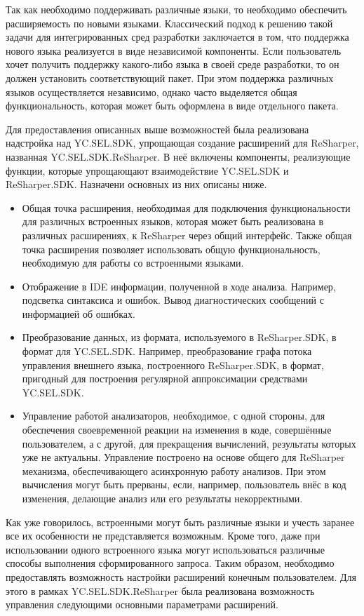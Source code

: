 Так как необходимо поддерживать различные языки, то необходимо обеспечить расширяемость по новыми языками. Классический подход к решению такой задачи для интегрированных сред разработки заключается в том, что поддержка нового языка реализуется в виде независимой компоненты. Если пользователь хочет получить поддержку какого-либо языка в своей среде разработки, то он должен установить соответствующий пакет. При этом поддержка различных языков осуществляется независимо, однако часто выделяется общая функциональность, которая может быть оформлена в виде отдельного пакета.

Для предоставления описанных выше возможностей была реализована надстройка над YC.SEL.SDK, упрощающая создание расширений для ReSharper, названная  YC.SEL.SDK.ReSharper. В неё включены компоненты, реализующие функции, которые упрощающают взаимодействие YC.SEL.SDK и ReSharper.SDK. Назначени основных из них описаны ниже.

\begin{itemize}
  \item Общая точка расширения, необходимая для подключения функциональности для различных встроенных языков, которая может быть реализована в различных расширениях, к ReSharper через общий интерфейс. Также общая точка расширения позволяет использовать общую функциональность, необходимую для работы со встроенными языками.
  \item Отображение в IDE информации, полученной в ходе анализа. Например, подсветка синтаксиса и ошибок. Вывод диагностических сообщений с информацией об ошибках.
  \item Преобразование данных, из формата, используемого в ReSharper.SDK, в формат для YC.SEL.SDK. Например, преобразование графа потока управления внешнего языка, построенного ReSharper.SDK, в формат, пригодный для построения регулярной аппроксимации средствами YC.SEL.SDK.
  \item Управление работой анализаторов, необходимое, с одной стороны, для обеспечения своевременной реакции на изменения в коде, совершённые пользователем, а с другой, для прекращения вычислений, результаты которых уже не актуальны. Управление построено на основе общего для ReSharper механизма, обеспечивающего асинхронную работу анализов. При этом вычисления могут быть прерваны, если, например, пользователь внёс в код изменения, делающие анализ или его результаты некорректными. 
\end{itemize}

Как уже говорилось, встроенными могут быть различные языки и учесть заранее все их особенности не представляется возможным. Кроме того, даже при использовании одного встроенного языка могут использоваться различные способы выполнения сформированного запроса. Таким образом, необходимо предоставлять возможность настройки расширений конечным пользователем. Для этого в рамках YC.SEL.SDK.ReSharper была реализована возможность управления следующими основными параметрами расширений. 

